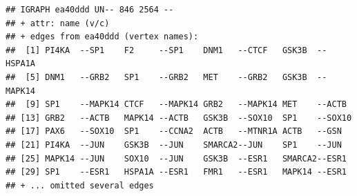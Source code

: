 \documentclass[
]{book}
\newenvironment{Shaded}{\begin{snugshade}}{\end{snugshade}}
\newcommand{\AttributeTok}[1]{\textcolor[rgb]{0.77,0.63,0.00}{#1}}
\newcommand{\ConstantTok}[1]{\textcolor[rgb]{0.00,0.00,0.00}{#1}}
\newcommand{\DecValTok}[1]{\textcolor[rgb]{0.00,0.00,0.81}{#1}}
\newcommand{\FloatTok}[1]{\textcolor[rgb]{0.00,0.00,0.81}{#1}}
\newcommand{\FunctionTok}[1]{\textcolor[rgb]{0.00,0.00,0.00}{#1}}
\newcommand{\NormalTok}[1]{#1}
\newcommand{\OtherTok}[1]{\textcolor[rgb]{0.56,0.35,0.01}{#1}}
\newcommand{\SpecialCharTok}[1]{\textcolor[rgb]{0.00,0.00,0.00}{#1}}
\newcommand{\StringTok}[1]{\textcolor[rgb]{0.31,0.60,0.02}{#1}}
\begin{document}
\begin{verbatim}
## IGRAPH ea40ddd UN-- 846 2564 -- 
## + attr: name (v/c)
## + edges from ea40ddd (vertex names):
##  [1] PI4KA  --SP1    F2     --SP1    DNM1   --CTCF   GSK3B  --HSPA1A
##  [5] DNM1   --GRB2   SP1    --GRB2   MET    --GRB2   GSK3B  --MAPK14
##  [9] SP1    --MAPK14 CTCF   --MAPK14 GRB2   --MAPK14 MET    --ACTB  
## [13] GRB2   --ACTB   MAPK14 --ACTB   GSK3B  --SOX10  SP1    --SOX10 
## [17] PAX6   --SOX10  SP1    --CCNA2  ACTB   --MTNR1A ACTB   --GSN   
## [21] PI4KA  --JUN    GSK3B  --JUN    SMARCA2--JUN    SP1    --JUN   
## [25] MAPK14 --JUN    SOX10  --JUN    GSK3B  --ESR1   SMARCA2--ESR1  
## [29] SP1    --ESR1   HSPA1A --ESR1   FMR1   --ESR1   MAPK14 --ESR1  
## + ... omitted several edges
\end{verbatim}

\begin{Shaded}
\end{Shaded}
\end{document}
